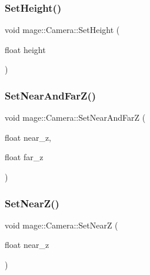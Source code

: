 \hypertarget{classmage_1_1_camera_a53ca727373580b145339d4dd93e2c65f}{}\label{classmage_1_1_camera_a53ca727373580b145339d4dd93e2c65f} 
\subsubsection{\texorpdfstring{Set\+Height()}{SetHeight()}}
{\footnotesize\ttfamily void mage\+::\+Camera\+::\+Set\+Height (\begin{DoxyParamCaption}\item[{float}]{height }\end{DoxyParamCaption})}

\hypertarget{classmage_1_1_camera_a1800467939c0806405e9a708dbd838f8}{}\label{classmage_1_1_camera_a1800467939c0806405e9a708dbd838f8} 
\subsubsection{\texorpdfstring{Set\+Near\+And\+Far\+Z()}{SetNearAndFarZ()}}
{\footnotesize\ttfamily void mage\+::\+Camera\+::\+Set\+Near\+And\+FarZ (\begin{DoxyParamCaption}\item[{float}]{near\+\_\+z,  }\item[{float}]{far\+\_\+z }\end{DoxyParamCaption})}

\hypertarget{classmage_1_1_camera_a4aa60bcc75822457ccb8be2ff0ce93a4}{}\label{classmage_1_1_camera_a4aa60bcc75822457ccb8be2ff0ce93a4} 
\subsubsection{\texorpdfstring{Set\+Near\+Z()}{SetNearZ()}}
{\footnotesize\ttfamily void mage\+::\+Camera\+::\+Set\+NearZ (\begin{DoxyParamCaption}\item[{float}]{near\+\_\+z }\end{DoxyParamCaption})}

\hypertarget{classmage_1_1_camera_aa99e2452c6d0629e7018d32cb9d222dd}{}\label{classmage_1_1_camera_aa99e2452c6d0629e7018d32cb9d222dd} 
